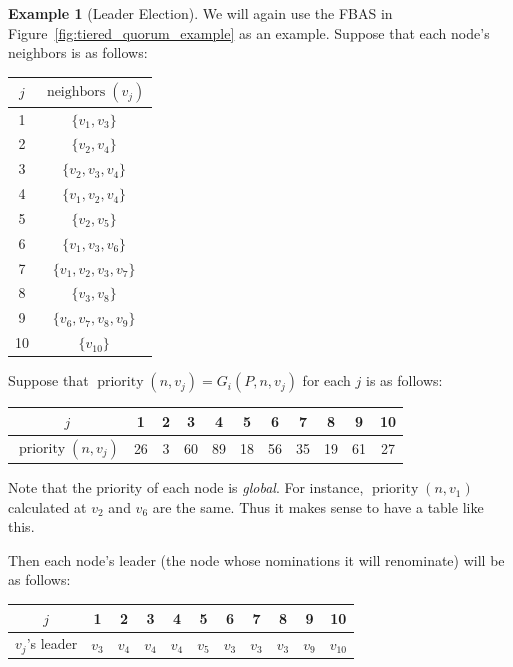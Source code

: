 \documentclass[12pt, psamsfonts]{amsart}
\theoremstyle{definition}
\newtheorem{exmp}[thm]{Example}
\theoremstyle{remark}
\DeclareMathOperator{\neighbors}{neighbors}
\DeclareMathOperator{\priority}{priority}
\numberwithin{equation}{subsection}
\begin{document}
\begin{exmp}[Leader Election]
    We will again use the FBAS in Figure~\ref{fig:tiered_quorum_example} as an example.
    Suppose that each node's neighbors is as follows:
    \begin{center}
      \begin{tabular}{ | c | c | }
        \hline
            $j$ & $\neighbors(v_j)$ \\ \hline
            1 & $\{ v_1, v_3 \}$ \\ \hline
            2 & $\{ v_2, v_4 \}$ \\ \hline
            3 & $\{ v_2, v_3, v_4 \}$ \\ \hline
            4 & $\{ v_1, v_2, v_4 \}$ \\ \hline
            5 & $\{ v_2, v_5 \}$ \\ \hline
            6 & $\{ v_1, v_3, v_6\}$ \\ \hline
            7 & $\{ v_1, v_2, v_3, v_7 \}$ \\ \hline
            8 & $\{ v_3, v_8 \}$ \\ \hline
            9 & $\{ v_6, v_7, v_8, v_9 \}$ \\ \hline
            10 & $\{ v_{10} \}$ \\
        \hline
      \end{tabular}
    \end{center}
    Suppose that $\priority(n, v_j) = G_i(P, n, v_j)$ for each $j$ is as follows:
    \begin{center}
      \begin{tabular}{ | c | c | c | c | c | c | c | c | c | c | c | }
        \hline
            $j$ & 1 & 2 & 3 & 4 & 5 & 6 & 7 & 8 & 9 & 10 \\ \hline
            $\priority(n, v_j)$ &  26 & 3 & 60 & 89 & 18 & 56 & 35 & 19 & 61 & 27\\
        \hline
      \end{tabular}
    \end{center}
    Note that the priority of each node is \textit{global}.
    For instance, $\priority(n, v_1)$ calculated at $v_2$ and $v_6$ are the same.
    Thus it makes sense to have a table like this.

    Then each node's leader (the node whose nominations it will renominate) will be as follows:
    \begin{center}
      \begin{tabular}{ | c | c | c | c | c | c | c | c | c | c | c | }
        \hline
            $j$ & 1 & 2 & 3 & 4 & 5 & 6 & 7 & 8 & 9 & 10 \\ \hline
            $v_j$'s leader & $v_3$ & $v_4$ & $v_4$ & $v_4$ & $v_5$ & $v_3$ & $v_3$ & $v_3$ & $v_9$ & $v_{10}$ \\
        \hline
      \end{tabular}
    \end{center}


\end{exmp}
\end{document}
